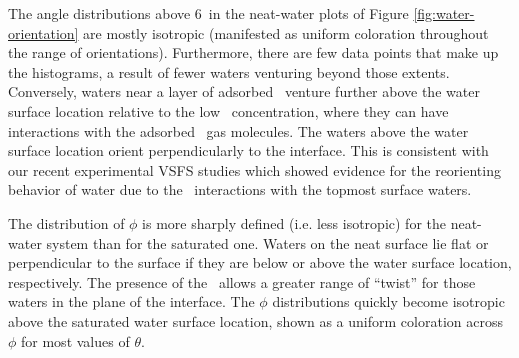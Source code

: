 \documentclass{article}
\begin{document}

The angle distributions above 6\angs~in the neat-water plots of Figure \ref{fig:water-orientation} are mostly isotropic (manifested as uniform coloration throughout the range of orientations). Furthermore, there are few data points that make up the histograms, a result of fewer waters venturing beyond those extents. Conversely, waters near a layer of adsorbed \suldiox~venture further above the water surface location relative to the low \suldiox~concentration, where they can have interactions with the adsorbed \suldiox~gas molecules. The waters above the water surface location orient perpendicularly to the interface. This is consistent with our recent experimental VSFS studies which showed evidence for the reorienting behavior of water due to the \suldiox~interactions with the topmost surface waters.\cite{Ota2011}

The distribution of $\phi$ is more sharply defined (i.e. less isotropic) for the neat-water system than for the saturated one. Waters on the neat surface lie flat or perpendicular to the surface if they are below or above the water surface location, respectively. The presence of the \suldiox~allows a greater range of ``twist'' for those waters in the plane of the interface. The $\phi$ distributions quickly become isotropic above the saturated water surface location, shown as a uniform coloration across $\phi$ for most values of $\theta$.

\end{document}
